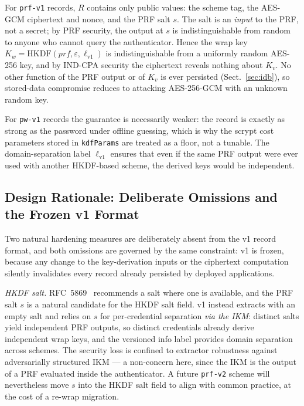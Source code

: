\documentclass[runningheads]{llncs}
\begin{document}
For \texttt{prf-v1} records, $R$ contains only public values: the scheme tag, the AES-GCM ciphertext and nonce, and the PRF salt $s$.
The salt is an \emph{input} to the PRF, not a secret; by PRF security, the output at $s$ is indistinguishable from random to anyone who cannot query the authenticator.
Hence the wrap key $K_w = \mathrm{HKDF}(prf, \varepsilon, \ell_{\mathrm{v1}})$ is indistinguishable from a uniformly random AES-256 key, and by IND-CPA security the ciphertext reveals nothing about $K_v$.
No other function of the PRF output or of $K_v$ is ever persisted (Sect.~\ref{sec:idb}), so stored-data compromise reduces to attacking AES-256-GCM with an unknown random key.

For \texttt{pw-v1} records the guarantee is necessarily weaker: the record is exactly as strong as the password under offline guessing, which is why the scrypt cost parameters stored in \texttt{kdfParams} are treated as a floor, not a tunable.
The domain-separation label $\ell_{\mathrm{v1}}$ ensures that even if the same PRF output were ever used with another HKDF-based scheme, the derived keys would be independent.

\subsection{Design Rationale: Deliberate Omissions and the Frozen v1 Format}
\label{sec:rationale}
Two natural hardening measures are deliberately absent from the v1 record format, and both omissions are governed by the same constraint: v1 is frozen, because any change to the key-derivation inputs or the ciphertext computation silently invalidates every record already persisted by deployed applications.

\emph{HKDF salt.}
RFC~5869~\cite{rfc5869} recommends a salt where one is available, and the PRF salt $s$ is a natural candidate for the HKDF salt field.
v1 instead extracts with an empty salt and relies on $s$ for per-credential separation \emph{via the IKM}: distinct salts yield independent PRF outputs, so distinct credentials already derive independent wrap keys, and the versioned info label provides domain separation across schemes.
The security loss is confined to extractor robustness against adversarially structured IKM --- a non-concern here, since the IKM is the output of a PRF evaluated inside the authenticator.
A future \texttt{prf-v2} scheme will nevertheless move $s$ into the HKDF salt field to align with common practice, at the cost of a re-wrap migration.
\end{document}
